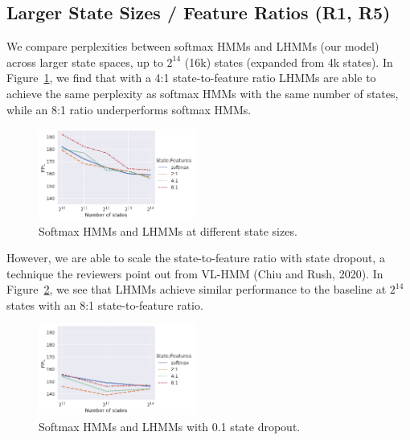 \documentclass{article}
\begin{document}
\subsection{Larger State Sizes / Feature Ratios (R1, R5)}
We compare perplexities between softmax HMMs and LHMMs (our model) across larger state spaces, up to $2^{14}$ (16k) states (expanded from 4k states).
In Figure~\ref{fig:ppl},
we find that with a 4:1 state-to-feature ratio LHMMs are able to achieve the same perplexity as softmax HMMs with the same number of states, while an 8:1 ratio underperforms softmax HMMs.
\begin{figure}[!htp]
  \centering
    \vspace*{-0.3cm}
  \includegraphics[width=0.46\textwidth]{imgs/hmm/lhmm-states-features.png}
  \vspace*{-0.5cm}
  \caption{\label{fig:ppl}
  Softmax HMMs and LHMMs at different state sizes.
  }
  \vspace{-0.4cm}
\end{figure}
However, we are able to scale the state-to-feature ratio with state dropout, a technique the reviewers point out from VL-HMM (Chiu and Rush, 2020). In Figure~\ref{fig:dropout}, we see that LHMMs achieve similar performance to the baseline at $2^{14}$ states with an 8:1 state-to-feature ratio.
\begin{figure}[!htp]
  \centering
  \vspace*{-0.3cm}
  \includegraphics[width=0.46\textwidth]{imgs/hmm/lhmm-states-features-dropout.png}
  \vspace*{-0.5cm}
  \caption{\label{fig:dropout}
  Softmax HMMs and LHMMs with 0.1 state dropout.
}
\vspace{-0.6cm}
\end{figure}
\end{document}
